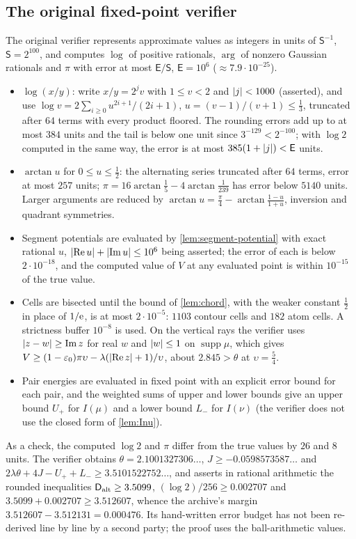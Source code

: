 \subsection{The original fixed-point verifier}\label{subsec:fixed-point}

The original verifier represents approximate values as integers in units of $\mathsf S^{-1}$,
$\mathsf S=2^{100}$, and computes $\log$ of positive rationals, $\arg$ of nonzero Gaussian
rationals and $\pi$ with error at most $\mathsf E/\mathsf S$, $\mathsf E=10^6$
($\approx7.9\cdot10^{-25}$).
\begin{itemize}
  \item $\log(x/y)$: write $x/y=2^jv$ with $1\le v<2$ and $\lvert j\rvert<1000$ (asserted), and use
  $\log v=2\sum_{i\ge0}u^{2i+1}/(2i+1)$, $u=(v-1)/(v+1)\le\frac13$, truncated after $64$ terms with
  every product floored. The rounding errors add up to at most $384$ units and the tail is below
  one unit since $3^{-129}<2^{-100}$; with $\log2$ computed in the same way, the error is at most
  $385(1+\lvert j\rvert)<\mathsf E$ units.
  \item $\arctan u$ for $0\le u\le\frac12$: the alternating series truncated after $64$ terms,
  error at most $257$ units; $\pi=16\arctan\frac15-4\arctan\frac1{239}$ has error below $5140$ units.
  Larger arguments are reduced by $\arctan u=\frac\pi4-\arctan\frac{1-u}{1+u}$, inversion and
  quadrant symmetries.
  \item Segment potentials are evaluated by \cref{lem:segment-potential} with exact rational $u$,
  $\lvert \operatorname{Re}u\rvert+\lvert \operatorname{Im}u\rvert\le10^6$ being asserted; the error of each is
  below $2\cdot10^{-18}$, and the computed value of $V$ at any evaluated point is within
  $10^{-15}$ of the true value.
  \item Cells are bisected until the bound of \cref{lem:chord}, with the weaker constant
  $\frac12$ in place of $1/\mathrm{e}$, is at most $2\cdot10^{-5}$: $1103$ contour cells and $182$ atom
  cells. A strictness buffer $10^{-8}$ is used. On the vertical rays the verifier uses
  $\lvert z-w\rvert\ge\operatorname{Im}z$ for real $w$ and $\lvert w\rvert\le1$ on $\operatorname{supp}\mu$, which
  gives $V\ge(1-\varepsilon_0)\pi\upsilon-\lambda(\lvert \operatorname{Re}z\rvert+1)/\upsilon$, about
  $2.845>\theta$ at $\upsilon=\frac54$.
  \item Pair energies are evaluated in fixed point with an explicit error bound for each pair, and
  the weighted sums of upper and lower bounds give an upper bound $U_+$ for $I(\mu)$ and a lower
  bound $L_-$ for $I(\nu)$ (the verifier does not use the closed form of \cref{lem:Inu}).
\end{itemize}
As a check, the computed $\log2$ and $\pi$ differ from the true values by $26$ and $8$ units. The
verifier obtains $\theta=2.1001327306\ldots$, $J\ge-0.0598573587\ldots$ and
$2\lambda\theta+4J-U_++L_-\ge3.5101522752\ldots$, and asserts in rational arithmetic the rounded
inequalities $\mathsf{D}_{\mathrm{alt}}\ge3.5099$, $(\log2)/256\ge0.002707$ and $3.5099+0.002707\ge3.512607$,
whence the archive's margin $3.512607-3.512131=0.000476$. Its hand-written error budget has not
been re-derived line by line by a second party; the proof uses the ball-arithmetic values.
